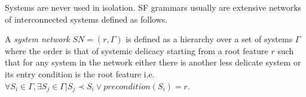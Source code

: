     Systems are never used in isolation. SF grammars usually are extensive networks of interconnected systems defined as follows. 


    \begin{definition}\label{def:system-network}
        A \textit{system network} $SN=(r,\Gamma)$ is defined as a hierarchy over a set of systems $\Gamma$ where the order is that of systemic delicacy starting from a root feature $r$ such that for any system in the network either there is another less delicate system or its entry condition is the root feature i.e. \mbox{$\forall S_{i} \in \Gamma, \exists S_{j} \in \Gamma | S_{j} \prec S_{i} \lor precondition(S_{i})=r$}. 
    \end{definition}

